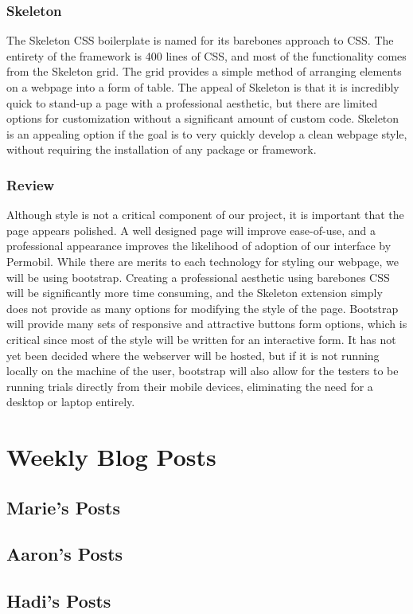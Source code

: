 \documentclass[onecolumn, draftclsnofoot,10pt, compsoc]{report}
\begin{document}
\subsection{Skeleton}
The Skeleton CSS boilerplate is named for its barebones approach to CSS. The entirety of the framework is 400 lines
of CSS, and most of the functionality comes from the Skeleton grid. The grid provides a simple method of arranging
elements on a webpage into a form of table. The appeal of Skeleton is that it is incredibly quick to stand-up a page
with a professional aesthetic, but there are limited options for customization without a significant amount of custom
code. Skeleton is an appealing option if the goal is to very quickly develop a clean webpage style, without requiring the
installation of any package or framework.
\subsection{Review}
Although style is not a critical component of our project, it is important that the page appears polished. A well designed
page will improve ease-of-use, and a professional appearance improves the likelihood of adoption of our interface by
Permobil. While there are merits to each technology for styling our webpage, we will be using bootstrap. Creating a
professional aesthetic using barebones CSS will be significantly more time consuming, and the Skeleton extension simply
does not provide as many options for modifying the style of the page. Bootstrap will provide many sets of responsive
and attractive buttons form options, which is critical since most of the style will be written for an interactive form. It
has not yet been decided where the webserver will be hosted, but if it is not running locally on the machine of the user,
bootstrap will also allow for the testers to be running trials directly from their mobile devices, eliminating the need for
a desktop or laptop entirely.


\chapter{Weekly Blog Posts}
\minitoc
\section{Marie's Posts}
\section{Aaron's Posts}
\section{Hadi's Posts}
\end{document}
